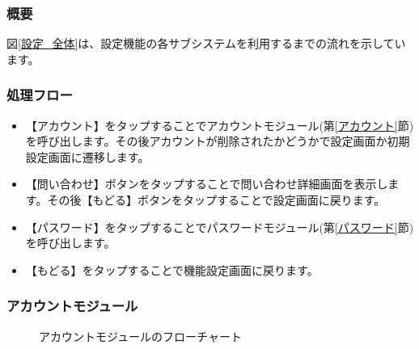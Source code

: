 \documentclass[a4j]{jarticle}
\begin{document}
\subsubsection*{概要}
図\ref{設定_全体}は、設定機能の各サブシステムを利用するまでの流れを示しています。
\subsubsection*{処理フロー}
\begin{itemize}
\item 【アカウント】をタップすることでアカウントモジュール(第\ref{アカウント}節)を呼び出します。その後アカウントが削除されたかどうかで設定画面か初期設定画面に遷移します。

\item 【問い合わせ】ボタンをタップすることで問い合わせ詳細画面を表示します。その後【もどる】ボタンをタップすることで設定画面に戻ります。

\item 【パスワード】をタップすることでパスワードモジュール(第\ref{パスワード}節)を呼び出します。

\item 【もどる】をタップすることで機能設定画面に戻ります。
\end{itemize}

\subsubsection{アカウントモジュール\label{アカウント}} %
\begin{figure}[H]
    \begin{center}
    \caption {アカウントモジュールのフローチャート}
    \label{設定_アカウント}
    \end{center}
\end{figure}
\end{document}
